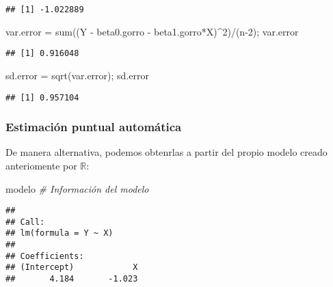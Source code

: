 \documentclass[
]{article}
\newenvironment{Shaded}{\begin{snugshade}}{\end{snugshade}}
\newcommand{\CommentTok}[1]{\textcolor[rgb]{0.56,0.35,0.01}{\textit{#1}}}
\newcommand{\DecValTok}[1]{\textcolor[rgb]{0.00,0.00,0.81}{#1}}
\newcommand{\FunctionTok}[1]{\textcolor[rgb]{0.00,0.00,0.00}{#1}}
\newcommand{\NormalTok}[1]{#1}
\newcommand{\OtherTok}[1]{\textcolor[rgb]{0.56,0.35,0.01}{#1}}
\newcommand{\SpecialCharTok}[1]{\textcolor[rgb]{0.00,0.00,0.00}{#1}}
\begin{document}
\begin{verbatim}
## [1] -1.022889
\end{verbatim}

\begin{Shaded}
\begin{Highlighting}[]
\NormalTok{var.error }\OtherTok{=} \FunctionTok{sum}\NormalTok{((Y }\SpecialCharTok{{-}}\NormalTok{ beta0.gorro }\SpecialCharTok{{-}}\NormalTok{ beta1.gorro}\SpecialCharTok{*}\NormalTok{X)}\SpecialCharTok{\^{}}\DecValTok{2}\NormalTok{)}\SpecialCharTok{/}\NormalTok{(n}\DecValTok{{-}2}\NormalTok{); var.error}
\end{Highlighting}
\end{Shaded}

\begin{verbatim}
## [1] 0.916048
\end{verbatim}

\begin{Shaded}
\begin{Highlighting}[]
\NormalTok{sd.error }\OtherTok{=} \FunctionTok{sqrt}\NormalTok{(var.error); sd.error}
\end{Highlighting}
\end{Shaded}

\begin{verbatim}
## [1] 0.957104
\end{verbatim}

\hypertarget{estimaciuxf3n-puntual-automuxe1tica}{%
\subsubsection{Estimación puntual
automática}\label{estimaciuxf3n-puntual-automuxe1tica}}

De manera alternativa, podemos obtenrlas a partir del propio modelo
creado anteriomente por \(\mathbb{R}\):

\begin{Shaded}
\begin{Highlighting}[]
\NormalTok{modelo    }\CommentTok{\# Información del modelo}
\end{Highlighting}
\end{Shaded}

\begin{verbatim}
## 
## Call:
## lm(formula = Y ~ X)
## 
## Coefficients:
## (Intercept)            X  
##       4.184       -1.023
\end{verbatim}

\begin{Shaded}
\end{Shaded}
\end{document}

